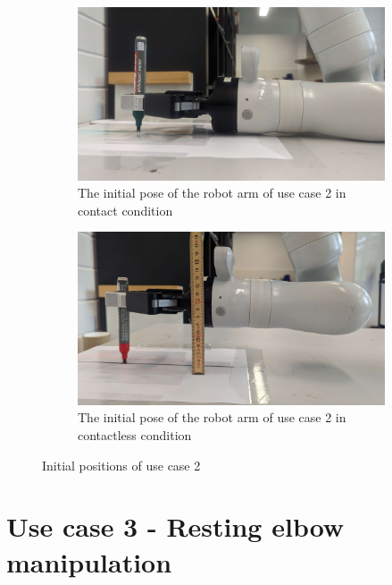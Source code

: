 \documentclass[report.tex]{subfiles}
\begin{document}
    \begin{figure}[H]
    \captionsetup[subfigure]{justification=centering}
    \begin{subfigure}{0.5\textwidth}
            \centering
            \includegraphics[width=\linewidth]{images/us2_contact.jpg}
            \caption{The initial pose of the robot arm of use case 2 in contact condition}
            \label{fig:us2_init_con}
        \end{subfigure}
        \begin{subfigure}{0.5\textwidth}
            \centering
            \includegraphics[width=\linewidth]{images/us2_nocontact.jpg}
            \caption{The initial pose of the robot arm of use case 2 in contactless condition}
            \label{fig:us2_init_nocon}
        \end{subfigure}
        \caption{Initial positions of use case 2}
    \end{figure}

\section{Use case 3 - Resting elbow manipulation}
\end{document}
